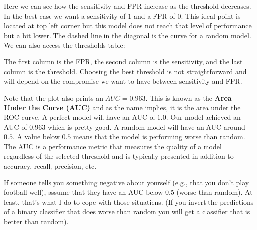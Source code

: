 \documentclass[
  11pt,
]{krantz}
\makeatletter
\newenvironment{Shaded}{\begin{snugshade}}{\end{snugshade}}
\newcommand{\CommentTok}[1]{\textcolor[rgb]{0.37,0.37,0.37}{\textit{#1}}}
\newcommand{\NormalTok}[1]{#1}
\newcommand{\SpecialCharTok}[1]{\textcolor[rgb]{0,0,0}{#1}}
\newenvironment{kframe}{%
\medskip{}
\setlength{\fboxsep}{.8em}
 \def\at@end@of@kframe{}%
 \ifinner\ifhmode%
  \def\at@end@of@kframe{\end{minipage}}%
  \begin{minipage}{\columnwidth}%
 \fi\fi%
 \def\FrameCommand##1{\hskip\@totalleftmargin \hskip-\fboxsep
 \colorbox{shadecolor}{##1}\hskip-\fboxsep
     \hskip-\linewidth \hskip-\@totalleftmargin \hskip\columnwidth}%
 \MakeFramed {\advance\hsize-\width
   \@totalleftmargin\z@ \linewidth\hsize
   \@setminipage}}%
 {\par\unskip\endMakeFramed%
 \at@end@of@kframe}
\newenvironment{rmdblock}[1]
  {
  \begin{itemize}
  \renewcommand{\labelitemi}{
    \raisebox{-.7\height}[0pt][0pt]{
      {\setkeys{Gin}{width=3em,keepaspectratio}\texttt{[image: images/icons/\#1]}}
    }
  }
  \setlength{\fboxsep}{1em}
  \begin{kframe}
  \item
  }
  {
  \end{kframe}
  \end{itemize}
  }
\newenvironment{rmdgoodpractice}
  {\begin{rmdblock}{goodpractice}}
  {\end{rmdblock}}
\makeatother
\begin{document}
Here we can see how the sensitivity and FPR increase as the threshold decreases. In the best case we want a sensitivity of \(1\) and a FPR of \(0\). This ideal point is located at top left corner but this model does not reach that level of performance but a bit lower. The dashed line in the diagonal is the curve for a random model. We can also access the thresholds table:

\begin{Shaded}
\end{Shaded}

The first column is the FPR, the second column is the sensitivity, and the last column is the threshold. Choosing the best threshold is not straightforward and will depend on the compromise we want to have between sensitivity and FPR.

Note that the plot also prints an \(AUC=0.963\). This is known as the \textbf{Area Under the Curve (AUC)} and as the name implies, it is the area under the ROC curve. A perfect model will have an AUC of \(1.0\). Our model achieved an AUC of \(0.963\) which is pretty good. A random model will have an AUC around \(0.5\). A value below \(0.5\) means that the model is performing worse than random. The AUC is a performance metric that measures the quality of a model regardless of the selected threshold and is typically presented in addition to accuracy, recall, precision, etc.

\begin{rmdgoodpractice}
If someone tells you something negative about yourself (e.g., that you don't play football well), assume that they have an AUC below \(0.5\) (worse than random). At least, that's what I do to cope with those situations. (If you invert the predictions of a binary classifier that does worse than random you will get a classifier that is better than random).
\end{rmdgoodpractice}
\end{document}
